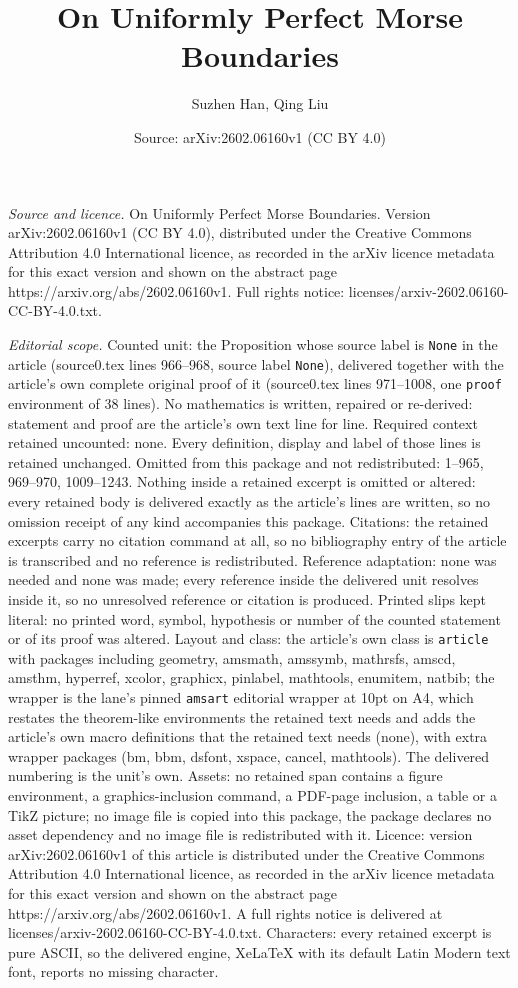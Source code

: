 \documentclass[10pt,a4paper]{amsart}
\title[On Uniformly Perfect Morse Boundaries]{On Uniformly Perfect Morse Boundaries}
\author{Suzhen Han, Qing Liu}
\date{Source: arXiv:2602.06160v1 (CC BY 4.0)}
\begin{document}
\maketitle

\noindent\emph{Source and licence.} On Uniformly Perfect Morse Boundaries. Version arXiv:2602.06160v1 (CC BY 4.0), distributed under the Creative Commons Attribution 4.0 International licence, as recorded in the arXiv licence metadata for this exact version and shown on the abstract page https://arxiv.org/abs/2602.06160v1. Full rights notice: licenses/arxiv-2602.06160-CC-BY-4.0.txt.\par\smallskip

\noindent\textit{Editorial scope.} Counted unit: the Proposition whose source label is \texttt{None} in the article (source0.tex lines 966--968, source label \texttt{None}), delivered together with the article's own complete original proof of it (source0.tex lines 971--1008, one \texttt{proof} environment of 38 lines). No mathematics is written, repaired or re-derived: statement and proof are the article's own text line for line. Required context retained uncounted: none. Every definition, display and label of those lines is retained unchanged. Omitted from this package and not redistributed: 1--965, 969--970, 1009--1243. Nothing inside a retained excerpt is omitted or altered: every retained body is delivered exactly as the article's lines are written, so no omission receipt of any kind accompanies this package. Citations: the retained excerpts carry no citation command at all, so no bibliography entry of the article is transcribed and no reference is redistributed. Reference adaptation: none was needed and none was made; every reference inside the delivered unit resolves inside it, so no unresolved reference or citation is produced. Printed slips kept literal: no printed word, symbol, hypothesis or number of the counted statement or of its proof was altered. Layout and class: the article's own class is \texttt{article} with packages including geometry, amsmath, amssymb, mathrsfs, amscd, amsthm, hyperref, xcolor, graphicx, pinlabel, mathtools, enumitem, natbib; the wrapper is the lane's pinned \texttt{amsart} editorial wrapper at 10pt on A4, which restates the theorem-like environments the retained text needs and adds the article's own macro definitions that the retained text needs (none), with extra wrapper packages (bm, bbm, dsfont, xspace, cancel, mathtools). The delivered numbering is the unit's own. Assets: no retained span contains a figure environment, a graphics-inclusion command, a PDF-page inclusion, a table or a TikZ picture; no image file is copied into this package, the package declares no asset dependency and no image file is redistributed with it. Licence: version arXiv:2602.06160v1 of this article is distributed under the Creative Commons Attribution 4.0 International licence, as recorded in the arXiv licence metadata for this exact version and shown on the abstract page https://arxiv.org/abs/2602.06160v1. A full rights notice is delivered at licenses/arxiv-2602.06160-CC-BY-4.0.txt. Characters: every retained excerpt is pure ASCII, so the delivered engine, XeLaTeX with its default Latin Modern text font, reports no missing character.
\end{document}
